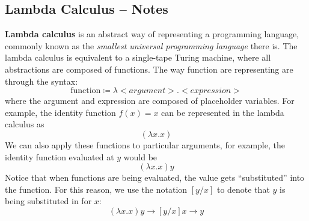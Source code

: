 \documentclass[12pt]{article}
\begin{document}
	\begin{center}
		\section*{Lambda Calculus -- Notes}
	\end{center}
	\textbf{Lambda calculus} is an abstract way of representing a programming language, commonly known as the \textit{smallest universal programming language} there is. The lambda calculus is equivalent to a single-tape Turing machine, where all abstractions are composed of functions. The way function are representing are through the syntax: \[ \text{function} \coloneqq \lambda <argument>.<expression>\]
	where the argument and expression are composed of placeholder variables. For example, the identity function $f(x) = x$ can be represented in the lambda calculus as \[ (\lambda x.x)\] We can also apply these functions to particular arguments, for example, the identity function evaluated at $y$ would be \[ (\lambda x.x)y\] Notice that when functions are being evaluated, the value gets ``substituted'' into the function. For this reason, we use the notation $[y/x]$ to denote that $y$ is being substituted in for $x$: \[ (\lambda x.x)y \to [y/x]x \to y\]
\end{document}
